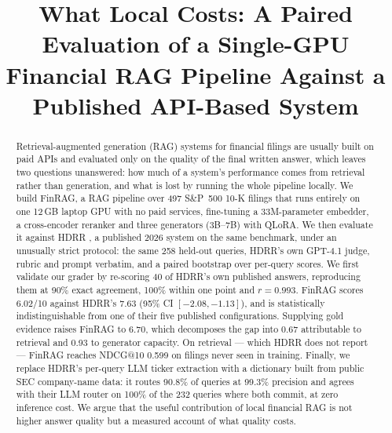 \documentclass[conference]{IEEEtran}
\begin{document}
\title{What Local Costs: A Paired Evaluation of a Single-GPU Financial RAG
Pipeline Against a Published API-Based System}

\author{
\and
{}
}

\maketitle

\begin{abstract}
Retrieval-augmented generation (RAG) systems for financial filings are usually
built on paid APIs and evaluated only on the quality of the final written
answer, which leaves two questions unanswered: how much of a system's
performance comes from retrieval rather than generation, and what is lost by
running the whole pipeline locally. We build FinRAG, a RAG pipeline over 497
S\&P~500 10-K filings that runs entirely on one 12\,GB laptop GPU with no paid
services, fine-tuning a 33M-parameter embedder, a cross-encoder reranker and
three generators (3B--7B) with QLoRA. We then evaluate it against HDRR
\cite{hdrr2026}, a published 2026 system on the same benchmark, under an
unusually strict protocol: the same 258 held-out queries, HDRR's own GPT-4.1
judge, rubric and prompt verbatim, and a paired bootstrap over per-query
scores. We first validate our grader by re-scoring 40 of HDRR's own published
answers, reproducing them at 90\% exact agreement, 100\% within one point and
$r=0.993$. FinRAG scores 6.02/10 against HDRR's 7.63 (95\% CI
$[-2.08,-1.13]$), and is statistically indistinguishable from one of their five
published configurations. Supplying gold evidence raises FinRAG to 6.70, which
decomposes the gap into 0.67 attributable to retrieval and 0.93 to generator
capacity. On retrieval --- which HDRR does not report --- FinRAG reaches
NDCG@10 0.599 on filings never seen in training. Finally, we replace HDRR's
per-query LLM ticker extraction with a dictionary built from public SEC
company-name data: it routes 90.8\% of queries at 99.3\% precision and agrees
with their LLM router on 100\% of the 232 queries where both commit, at zero
inference cost. We argue that the useful contribution of local financial RAG is
not higher answer quality but a measured account of what quality costs.
\end{abstract}
\end{document}
